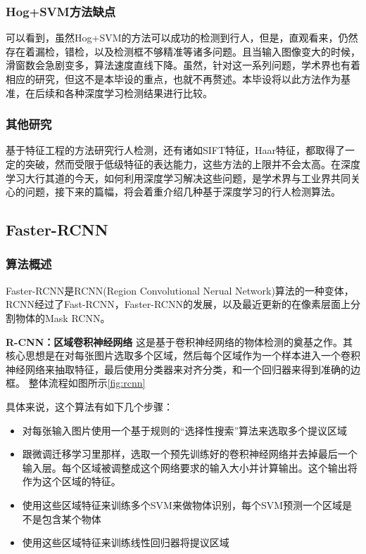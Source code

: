 \documentclass[12pt,a4paper,titlepage]{article}
\begin{document}
\subsubsection{Hog+SVM方法缺点}
可以看到，虽然Hog+SVM的方法可以成功的检测到行人，但是，直观看来，仍然存在着漏检，错检，以及检测框不够精准等诸多问题。且当输入图像变大的时候，滑窗数会急剧变多，算法速度直线下降。虽然，针对这一系列问题，学术界也有着相应的研究，但这不是本毕设的重点，也就不再赘述。本毕设将以此方法作为基准，在后续和各种深度学习检测结果进行比较。


\subsubsection{其他研究}
基于特征工程的方法研究行人检测，还有诸如SIFT特征，Haar特征，都取得了一定的突破，然而受限于低级特征的表达能力，这些方法的上限并不会太高。在深度学习大行其道的今天，如何利用深度学习解决这些问题，是学术界与工业界共同关心的问题，接下来的篇幅，将会着重介绍几种基于深度学习的行人检测算法。

\subsection{Faster-RCNN}
\subsubsection{算法概述}
Faster-RCNN是RCNN(Region Convolutional Nerual Network)算法的一种变体，RCNN经过了Fast-RCNN，Faster-RCNN的发展，以及最近更新的在像素层面上分割物体的Mask RCNN。
\par
\textbf{R-CNN：区域卷积神经网络}
这是基于卷积神经网络的物体检测的奠基之作。其核心思想是在对每张图片选取多个区域，然后每个区域作为一个样本进入一个卷积神经网络来抽取特征，最后使用分类器来对齐分类，和一个回归器来得到准确的边框。
整体流程如图所示\ref{fig:rcnn}

具体来说，这个算法有如下几个步骤：

\begin{itemize}
\item 对每张输入图片使用一个基于规则的“选择性搜索”算法来选取多个提议区域
\item 跟微调迁移学习里那样，选取一个预先训练好的卷积神经网络并去掉最后一个输入层。每个区域被调整成这个网络要求的输入大小并计算输出。这个输出将作为这个区域的特征。
\item 使用这些区域特征来训练多个SVM来做物体识别，每个SVM预测一个区域是不是包含某个物体
\item 使用这些区域特征来训练线性回归器将提议区域
\end{itemize}
\end{document}
